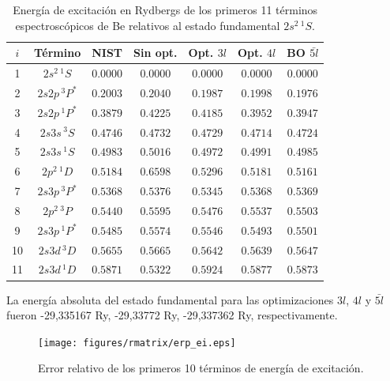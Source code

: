 \begin{table}
\centering
\begin{tabular}{|*{7}{c|}}
\hline 
$i$ & Término    & NIST      & Sin opt.  & Opt. $3l$  & Opt. $4l$  & BO $\bar{5l}$ \\
\hline 
\hline 
1 & $2s^2\,^1S$   & $0.0000$   & $0.0000$   & $0.0000$   & $0.0000$   & $0.0000$ \\
2 & $2s2p\,^3P^*$ & $0.2003$   & $0.2040$   & $0.1987$   & $0.1998$   & $0.1976$ \\
3 & $2s2p\,^1P^*$ & $0.3879$   & $0.4225$   & $0.4185$   & $0.3952$   & $0.3947$ \\
4 & $2s3s\,^3S$   & $0.4746$   & $0.4732$   & $0.4729$   & $0.4714$   & $0.4724$ \\
5 & $2s3s\,^1S$   & $0.4983$   & $0.5016$   & $0.4972$   & $0.4991$   & $0.4985$ \\
6 & $2p^2\,^1D$   & $0.5184$   & $0.6598$   & $0.5296$   & $0.5181$   & $0.5161$ \\
7 & $2s3p\,^3P^*$ & $0.5368$   & $0.5376$   & $0.5345$   & $0.5368$   & $0.5369$ \\
8 & $2p^2\,^3P$   & $0.5440$   & $0.5595$   & $0.5476$   & $0.5537$   & $0.5503$ \\
9 & $2s3p\,^1P^*$ & $0.5485$   & $0.5574$   & $0.5546$   & $0.5493$   & $0.5501$ \\
10 & $2s3d\,^3D$  & $0.5655$   & $0.5665$   & $0.5642$   & $0.5639$   & $0.5647$ \\
11 & $2s3d\,^1D$  & $0.5871$   & $0.5322$   & $0.5924$   & $0.5877$   & $0.5873$ \\
\hline
\end{tabular}
\caption[Energías de excitación de Be.]
{Energía de excitación en Rydbergs de los primeros 11 términos 
espectroscópicos de Be relativos al estado fundamental $2s^2\,^1S$.}
\label{tab:exener}
\end{table}

La energía absoluta del estado fundamental para las optimizaciones $3l$, 
$4l$ y $\bar{5l}$ fueron -29,335167 Ry, -29,33772 Ry, -29,337362 Ry, 
respectivamente. 


\begin{figure}
\centering
\texttt{[image: figures/rmatrix/erp\_ei.eps]} 
\caption[Error relativo de los primeros 10 términos de excitación.]
{Error relativo de los primeros 10 términos de energía de excitación.}
\label{fig:exener}
\end{figure}

